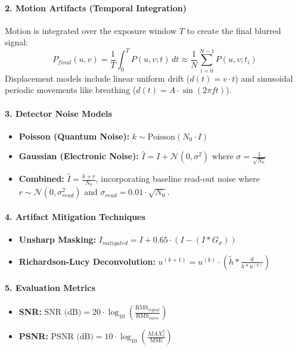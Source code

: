 \documentclass[12pt,a4paper]{article}
\begin{document}
\paragraph{2. Motion Artifacts (Temporal Integration)}
Motion is integrated over the exposure window $T$ to create the final blurred signal:
\[ P_{final}(u,v) = \frac{1}{T} \int_0^T P(u,v; t) \, dt \approx \frac{1}{N} \sum_{i=0}^{N-1} P(u,v; t_i) \]
Displacement models include linear uniform drift ($d(t) = v \cdot t$) and sinusoidal periodic movements like breathing ($d(t) = A \cdot \sin(2\pi f t)$).

\paragraph{3. Detector Noise Models}
\begin{itemize}
    \item \textbf{Poisson (Quantum Noise):} $k \sim \text{Poisson}(N_0 \cdot I)$
    \item \textbf{Gaussian (Electronic Noise):} $\hat{I} = I + \mathcal{N}(0, \sigma^2)$ where $\sigma = \frac{1}{\sqrt{N_0}}$
    \item \textbf{Combined:} $\hat{I} = \frac{k + r}{N_0}$, incorporating baseline read-out noise where $r \sim \mathcal{N}(0, \sigma_{read}^2)$ and $\sigma_{read} = 0.01 \cdot \sqrt{N_0}$.
\end{itemize}

\paragraph{4. Artifact Mitigation Techniques}
\begin{itemize}
    \item \textbf{Unsharp Masking:} $I_{mitigated} = I + 0.65 \cdot (I - (I * G_{\sigma}))$
    \item \textbf{Richardson-Lucy Deconvolution:} $u^{(k+1)} = u^{(k)} \cdot \left( \tilde{h} * \frac{d}{h * u^{(k)}} \right)$
\end{itemize}

\paragraph{5. Evaluation Metrics}
\begin{itemize}
    \item \textbf{SNR:} $\text{SNR (dB)} = 20 \cdot \log_{10}\left( \frac{\text{RMS}_{signal}}{\text{RMS}_{noise}} \right)$
    \item \textbf{PSNR:} $\text{PSNR (dB)} = 10 \cdot \log_{10}\left( \frac{MAX_I^2}{\text{MSE}} \right)$
\end{itemize}
\end{document}
